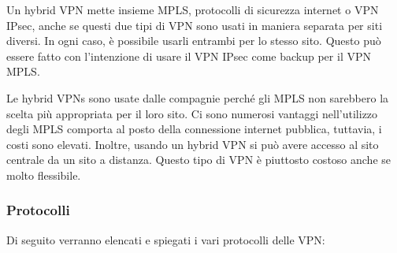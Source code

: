 \begin{itemize}
    Un hybrid VPN mette insieme MPLS, protocolli di sicurezza internet o VPN IPsec, anche se questi due tipi di VPN sono usati in maniera separata per siti diversi. In ogni caso, è possibile usarli entrambi per lo stesso sito. Questo può essere fatto con l’intenzione di usare il VPN IPsec come backup per il VPN MPLS.

    Le hybrid VPNs sono usate dalle compagnie perché gli MPLS non sarebbero la scelta più appropriata per il loro sito. Ci sono numerosi vantaggi nell’utilizzo degli MPLS comporta al posto della connessione internet pubblica, tuttavia, i costi sono elevati. Inoltre, usando un hybrid VPN si può avere accesso al sito centrale da un sito a distanza. Questo tipo di VPN è piuttosto costoso anche se molto flessibile.
\end{itemize}

\subsubsection{Protocolli}
Di seguito verranno elencati e spiegati i vari protocolli delle VPN:

